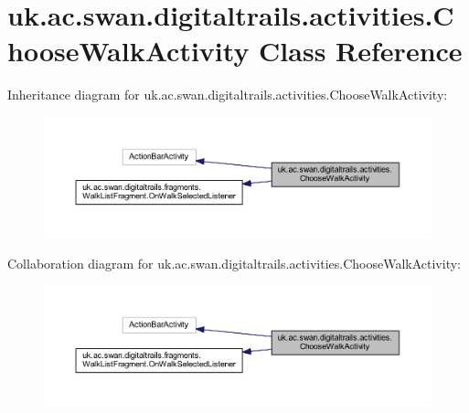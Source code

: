 \hypertarget{classuk_1_1ac_1_1swan_1_1digitaltrails_1_1activities_1_1_choose_walk_activity}{\section{uk.\+ac.\+swan.\+digitaltrails.\+activities.\+Choose\+Walk\+Activity Class Reference}
\label{classuk_1_1ac_1_1swan_1_1digitaltrails_1_1activities_1_1_choose_walk_activity}
}


Inheritance diagram for uk.\+ac.\+swan.\+digitaltrails.\+activities.\+Choose\+Walk\+Activity\+:\nopagebreak
\begin{figure}[H]
\begin{center}
\leavevmode
\includegraphics[width=350pt]{classuk_1_1ac_1_1swan_1_1digitaltrails_1_1activities_1_1_choose_walk_activity__inherit__graph}
\end{center}
\end{figure}


Collaboration diagram for uk.\+ac.\+swan.\+digitaltrails.\+activities.\+Choose\+Walk\+Activity\+:\nopagebreak
\begin{figure}[H]
\begin{center}
\leavevmode
\includegraphics[width=350pt]{classuk_1_1ac_1_1swan_1_1digitaltrails_1_1activities_1_1_choose_walk_activity__coll__graph}
\end{center}
\end{figure}
